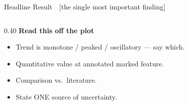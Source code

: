 \begin{frame}{Headline Result~\textemdash~[the single most important finding]}
\begin{columns}[T, totalwidth=\textwidth]
    \begin{column}{0.40\textwidth}
      \vspace{-4pt}
      \textbf{\color{sustBlueDark}Read this off the plot}
      \begin{itemize}\setlength\itemsep{2pt}
        \item Trend is monotone / peaked / oscillatory --- say which.
        \item Quantitative value at annotated marked feature.
        \item Comparison vs.\ literature.
        \item State ONE source of uncertainty.
      \end{itemize}
      \vspace{0.1cm}
    \end{column}
  \end{columns}
\end{frame}
